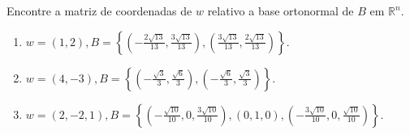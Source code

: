 \begin{question}
  Encontre a matriz de coordenadas de $w$ relativo a base ortonormal de $B$ em $\mathbb{R}^{n}$.
  \begin{enumerate}[label=\alph*)]
    \item $w = (1, 2), B = \left\{\left(-\frac{2\sqrt{13}}{13}, \frac{3\sqrt{13}}{13}\right), \left(\frac{3\sqrt{13}}{13}, \frac{2\sqrt{13}}{13}\right)\right\}$.
    \item $w = (4, -3), B = \left\{\left(-\frac{\sqrt{3}}{3}, \frac{\sqrt{6}}{3}\right), \left(-\frac{\sqrt{6}}{3}, \frac{\sqrt{3}}{3}\right)\right\}$.
    \item $w = (2, -2, 1), B = \left\{\left(-\frac{\sqrt{10}}{10}, 0, \frac{3\sqrt{10}}{10}\right), (0, 1, 0), \left(-\frac{3\sqrt{10}}{10}, 0, \frac{\sqrt{10}}{10}\right)\right\}$.
  \end{enumerate}
\end{question}

